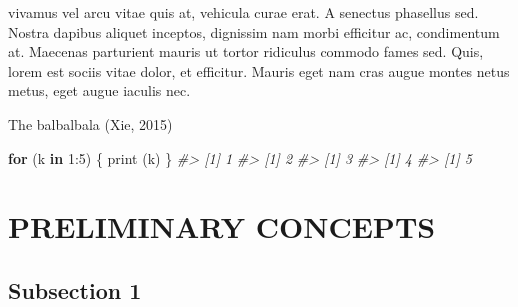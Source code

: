 \documentclass{source/tex/templates/maththesis}
\newenvironment{Shaded}{\begin{snugshade}}{\end{snugshade}}
\newcommand{\CommentTok}[1]{\textcolor[rgb]{0.56,0.35,0.01}{\textit{#1}}}
\newcommand{\ControlFlowTok}[1]{\textcolor[rgb]{0.13,0.29,0.53}{\textbf{#1}}}
\newcommand{\DecValTok}[1]{\textcolor[rgb]{0.00,0.00,0.81}{#1}}
\newcommand{\FunctionTok}[1]{\textcolor[rgb]{0.00,0.00,0.00}{#1}}
\newcommand{\NormalTok}[1]{#1}
\newcommand{\SpecialCharTok}[1]{\textcolor[rgb]{0.00,0.00,0.00}{#1}}
\begin{document}
vivamus vel arcu vitae quis at, vehicula curae erat. A senectus phasellus sed. Nostra dapibus aliquet inceptos, dignissim nam morbi efficitur ac, condimentum at. Maecenas parturient mauris ut tortor ridiculus commodo fames sed. Quis, lorem est sociis vitae dolor, et efficitur. Mauris eget nam cras augue montes netus metus, eget augue iaculis nec.

The balbalbala (Xie, 2015)

\begin{Shaded}
\begin{Highlighting}[]
\ControlFlowTok{for}\NormalTok{ (k }\ControlFlowTok{in} \DecValTok{1}\SpecialCharTok{:}\DecValTok{5}\NormalTok{) \{}
  \FunctionTok{print}\NormalTok{ (k)}
\NormalTok{\}}
\CommentTok{\#\textgreater{} [1] 1}
\CommentTok{\#\textgreater{} [1] 2}
\CommentTok{\#\textgreater{} [1] 3}
\CommentTok{\#\textgreater{} [1] 4}
\CommentTok{\#\textgreater{} [1] 5}
\end{Highlighting}
\end{Shaded}

\hypertarget{preliminary-concepts}{%
\chapter{PRELIMINARY CONCEPTS}\label{preliminary-concepts}}

\hypertarget{subsection-1-1}{%
\section{Subsection 1}\label{subsection-1-1}}
\end{document}
